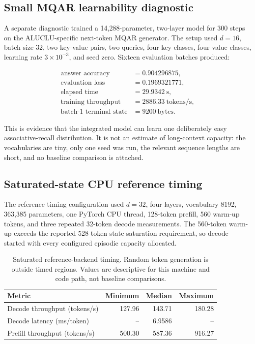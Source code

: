 \subsection{Small MQAR learnability diagnostic}

A separate diagnostic trained a 14,288-parameter, two-layer model for 300
steps on the ALUCLU-specific next-token MQAR generator. The setup used
\(d=16\), batch size 32, two key-value pairs, two queries, four key classes,
four value classes, learning rate \(3\times10^{-3}\), and seed zero. Sixteen
evaluation batches produced:

\begin{align}
  \text{answer accuracy} &= 0.904296875,\\
  \text{evaluation loss} &= 0.1969321771,\\
  \text{elapsed time} &= 29.9342\ \mathrm{s},\\
  \text{training throughput} &= 2886.33\ \mathrm{tokens/s},\\
  \text{batch-1 terminal state} &= 9200\ \mathrm{bytes}.
\end{align}

This is evidence that the integrated model can learn one deliberately easy
associative-recall distribution. It is not an estimate of long-context
capacity: the vocabularies are tiny, only one seed was run, the relevant
sequence lengths are short, and no baseline comparison is attached.

\subsection{Saturated-state CPU reference timing}

The reference timing configuration used \(d=32\), four layers, vocabulary
8192, 363,385 parameters, one PyTorch CPU thread, 128-token prefill, 560
warm-up tokens, and three repeated 32-token decode measurements. The 560-token
warm-up exceeds the reported 528-token state-saturation requirement, so decode
started with every configured episodic capacity allocated.

\begin{table}[h]
\centering
\caption{Saturated reference-backend timing. Random token generation is
outside timed regions. Values are descriptive for this machine and code path,
not baseline comparisons.}
\label{tab:cpu-results}
\begin{tabular}{@{}lrrr@{}}
\toprule
Metric & Minimum & Median & Maximum \\
\midrule
Decode throughput (tokens/s) & 127.96 & 143.71 & 180.28 \\
Decode latency (ms/token) & -- & 6.9586 & -- \\
Prefill throughput (tokens/s) & 500.30 & 587.36 & 916.27 \\
\bottomrule
\end{tabular}
\end{table}

